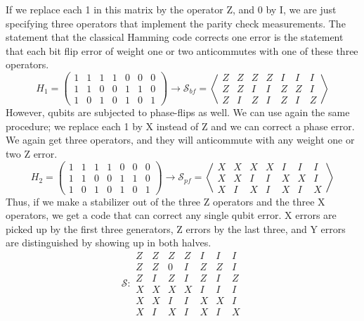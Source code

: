 If we replace each 1 in this matrix by the operator Z, and 0 by I, we are just specifying three operators that implement the parity check measurements. The statement that the classical Hamming code corrects one error is the statement that each bit flip error of weight one or two anticommutes with one of these three operators.
\begin{equation*}
    H_1=\left(\begin{array}{ccccccc}
         1&1&1&1&0&0&0  \\
         1&1&0&0&1&1&0 \\
         1&0&1&0&1&0&1 
    \end{array}\right) \to \mathcal{S}_{bf}=\left\langle\begin{array}{ccccccc}
         Z&Z&Z&Z&I&I&I  \\
         Z&Z&I&I&Z&Z&I \\
         Z&I&Z&I&Z&I&Z 
    \end{array}\right\rangle
\end{equation*}
However, qubits are subjected to phase-flips as well. We can use again the same procedure; we replace each 1 by X instead of Z and we can correct a phase error. We again get three operators, and they will anticommute with any weight one or two Z error.
\begin{equation*}
    H_2=\left(\begin{array}{ccccccc}
         1&1&1&1&0&0&0  \\
         1&1&0&0&1&1&0 \\
         1&0&1&0&1&0&1 
    \end{array}\right) \to \mathcal{S}_{pf}=\left\langle\begin{array}{ccccccc}
         X&X&X&X&I&I&I  \\
         X&X&I&I&X&X&I \\
         X&I&X&I&X&I&X 
    \end{array}\right\rangle
\end{equation*}
Thus, if we make a stabilizer out of the three Z operators and the three X operators, we get a code that can correct any single qubit error. X errors are picked up by the first three generators, Z errors by the last three, and Y errors are distinguished by showing up in both halves. 
\begin{equation}
    \mathcal{S} : \begin{array}{ccccccc}
         Z&Z&Z&Z&I&I&I  \\
         Z&Z&0&I&Z&Z&I \\
         Z&I&Z&I&Z&I&Z \\
         X&X&X&X&I&I&I  \\
         X&X&I&I&X&X&I \\
         X&I&X&I&X&I&X 
         \end{array}
         \label{eq:stabSteane}
\end{equation}
